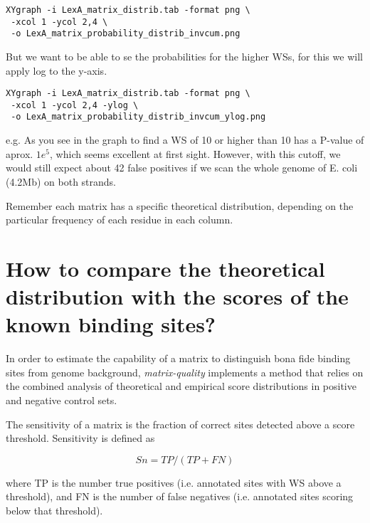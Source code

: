 {\color{Blue} 
\begin{footnotesize}
\begin{verbatim}
XYgraph -i LexA_matrix_distrib.tab -format png \
 -xcol 1 -ycol 2,4 \
 -o LexA_matrix_probability_distrib_invcum.png
\end{verbatim} 
\end{footnotesize} }

But we want to be able to se the probabilities for the higher WSs, for
this we will apply log to the y-axis.

{\color{Blue} 
  \begin{footnotesize}
\begin{verbatim}
XYgraph -i LexA_matrix_distrib.tab -format png \
 -xcol 1 -ycol 2,4 -ylog \
 -o LexA_matrix_probability_distrib_invcum_ylog.png
\end{verbatim} 
  \end{footnotesize} 
}


e.g. As you see in the graph to find a WS of 10 or higher than 10 has
a P-value of aprox. $1e^{5}$, which seems excellent at first
sight. However, with this cutoff, we would still expect about 42 false
positives if we scan the whole genome of E. coli (4.2Mb) on both
strands.

Remember each matrix has a specific theoretical distribution,
depending on the particular frequency of each residue in each column.

\section{How to compare the theoretical distribution with the scores
  of the known binding sites?}


In order to estimate the capability of a matrix to distinguish bona
fide binding sites from genome background, \textit{matrix-quality}
implements a method that relies on the combined analysis of
theoretical and empirical score distributions in positive and negative
control sets.

The sensitivity of a matrix is the fraction of correct sites detected
above a score threshold.  Sensitivity is defined as

\begin{equation}
Sn = TP /(TP + FN)
\end{equation}	 

where TP is the number true positives (i.e. annotated sites with WS
above a threshold), and FN is the number of false negatives
(i.e. annotated sites scoring below that threshold).

